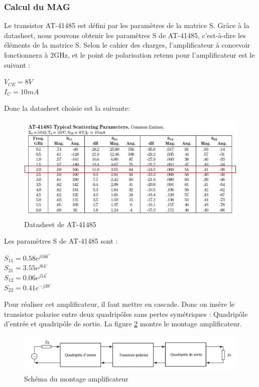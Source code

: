 \documentclass[french]{article}
\begin{document}
\subsubsection{Calcul du MAG}

Le transistor AT-41485 est défini par les paramètres de la matrice S. Grâce à la datasheet, nous pouvons obtenir les paramètres S de AT-41485, c'est-à-dire les éléments de la matrice S. Selon le cahier des charges, l'amplificateur à concevoir fonctionnera à 2GHz, et le point de polarisation retenu pour l’amplificateur est le suivant :

{\centering
	$V_{CE}=8V$\\
	$I_{C}=10mA$\\
}

Donc la datasheet choisie est la suivante: 
\begin{figure}[H]
	\centering
	\includegraphics[width=0.9\linewidth]{../5SynthAmp/Datasheet_AT41485}
	\caption{Datasheet de AT-41485}
	\label{fig:datasheet_AT}
\end{figure}

Les paramètres S de AT-41485 sont :

{\centering
$S_{11}=0.58e^{j166^{\circ}}$\\
$S_{21}=3.55e^{j64^{\circ}}$\\
$S_{12}=0.06e^{j54^{\circ}}$\\
$S_{22}=0.41e^{-j38^{\circ}}$\\
}

Pour réaliser cet amplificateur, il faut mettre en cascade. Donc on insère le transistor polarise entre deux quadripôles sans pertes symétriques : Quadripôle d’entrée et quadripôle de sortie. La figure \ref{fig:schema_ampli} montre le montage amplificateur. 
\begin{figure}[H]
	\centering
	\includegraphics[width=0.9\linewidth]{../5SynthAmp/Schema_ampli}
	\caption{Schéma du montage amplificateur}
	\label{fig:schema_ampli}
\end{figure}
\end{document}
